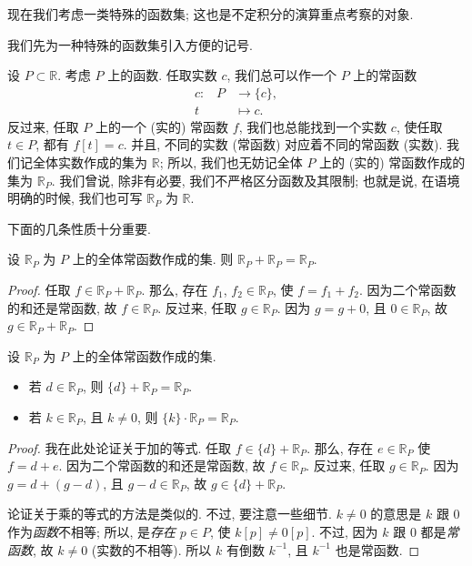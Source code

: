 现在我们考虑一类特殊的函数集; 这也是不定积分的演算重点考察的对象.

我们先为一种特殊的函数集引入方便的记号.

设 $P \subset \mathbb{R}$. 考虑 $P$ 上的函数. 任取实数 $c$, 我们总可以作一个 $P$ 上的常函数
\begin{align*}
    \text{$c$:} \quad
    P & \to \{ c \}, \\
    t & \mapsto c.
\end{align*}
反过来, 任取 $P$ 上的一个 (实的) 常函数 $f$, 我们也总能找到一个实数 $c$, 使任取 $t \in P$, 都有 $f[t] = c$. 并且, 不同的实数 (常函数) 对应着不同的常函数 (实数). 我们记全体实数作成的集为 $\mathbb{R}$; 所以, 我们也无妨记全体 $P$ 上的 (实的) 常函数作成的集为 $\mathbb{R}_{P}$. 我们曾说, 除非有必要, 我们不严格区分函数及其限制; 也就是说, 在语境明确的时候, 我们也可写 $\mathbb{R}_{P}$ 为 $\mathbb{R}$.

下面的几条性质十分重要.

\begin{theorem}
    设 $\mathbb{R}_{P}$ 为 $P$ 上的全体常函数作成的集. 则 $\mathbb{R}_{P} + \mathbb{R}_{P} = \mathbb{R}_{P}$.
\end{theorem}

\begin{proof}
    任取 $f \in \mathbb{R}_{P} + \mathbb{R}_{P}$. 那么, 存在 $f_1$, $f_2 \in \mathbb{R}_{P}$, 使 $f = f_1 + f_2$. 因为二个常函数的和还是常函数, 故 $f \in \mathbb{R}_{P}$. 反过来, 任取 $g \in \mathbb{R}_{P}$. 因为 $g = g + 0$, 且 $0 \in \mathbb{R}_{P}$, 故 $g \in \mathbb{R}_{P} + \mathbb{R}_{P}$.
\end{proof}

\begin{theorem}
    设 $\mathbb{R}_{P}$ 为 $P$ 上的全体常函数作成的集.
    \begin{itemize}
        \item 若 $d \in \mathbb{R}_{P}$, 则 $\{ d \} + \mathbb{R}_{P} = \mathbb{R}_{P}$.
        \item 若 $k \in \mathbb{R}_{P}$, 且 $k \neq 0$, 则 $\{ k \} \cdot \mathbb{R}_{P} = \mathbb{R}_{P}$.
    \end{itemize}
\end{theorem}

\begin{proof}
    我在此处论证关于加的等式. 任取 $f \in \{ d \} + \mathbb{R}_{P}$. 那么, 存在 $e \in \mathbb{R}_{P}$ 使 $f = d + e$. 因为二个常函数的和还是常函数, 故 $f \in \mathbb{R}_{P}$. 反过来, 任取 $g \in \mathbb{R}_{P}$. 因为 $g = d + (g - d)$, 且 $g - d \in \mathbb{R}_{P}$, 故 $g \in \{ d \} + \mathbb{R}_{P}$.

    论证关于乘的等式的方法是类似的. 不过, 要注意一些细节. $k \neq 0$ 的意思是 $k$ 跟 $0$ 作为\emph{函数}不相等; 所以, 是\emph{存在} $p \in P$, 使 $k[p] \neq 0[p]$. 不过, 因为 $k$ 跟 $0$ 都是\emph{常函数}, 故 $k \neq 0$ (实数的不相等). 所以 $k$ 有倒数 $k^{-1}$, 且 $k^{-1}$ 也是常函数.
\end{proof}

